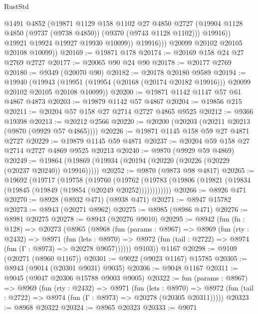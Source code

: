 \begin{lexlean}{RustStd}
\begin{coremodule}
{\begin{coremodule}
{{{{{{{{{{{{{{{{{{{{{{{{{{{{{{{{{{{{{{{                    @1491
                    @4852
                    (@19871
                      @1129
                      @158
                      @1102
                      @27
                      @4850
                      @2727
                      (@19904 @1128 @4850 (@9737 (@9738 @4850)) (@9370 (@9743 @1128 @1102)))
                      @19916))
                  @19921
                  @19924
                  @19927
                  @19930
                  @10099))
              @19916)))
        @20099
        @20102
        @20105
        @20108
        @10099))
@20169 := @19871 @178
@20174 := @20169 @158 @24 @27 @2769 @2727
@20177 := @20065 @90 @24 @90
@20178 := @20177 @2769
@20180 := @9349 (@20070 @90)
@20182 := @20178 @20180 @9589
@20194 := @19940
    (@19943 (@19951 (@19954 (@20168 (@20174 @20182 @19916))) @20099 @20102 @20105 @20108 @10099))
@20200 := @19871 @1142 @1147 @57 @61 @4867 @4873
@20203 := @19879 @1142 @57 @4867
@20204 := @19856 @215
@20211 := @20204 @57 @158 @27 @2714 @2727 @4865 @9525
@20212 := @9366 @19398
@20213 := @20212 @2566
@20220 := @20200 (@20203 (@20211 @20213 (@9870 (@9929 @57 @4865))))
@20226 := @19871 @1145 @158 @59 @27 @4871 @2727
@20229 := @19879 @1145 @59 @4871
@20237 := @20204 @59 @158 @27 @2714 @2727 @4869 @9525 @20213
@20240 := @9870 (@9929 @59 @4869)
@20249 := @19864 (@19869 (@19934 (@20194 (@20220 (@20226 (@20229 (@20237 @20240)) @19916)))))
@20252 := @9870 (@9873 @98 @4817)
@20265 := @19692
    (@19717
      (@19758
        (@19760
          (@19762 (@19783 (@19806 (@19821 (@19834 (@19845 (@19849 (@19854 (@20249 @20252))))))))))))
@20266 := @8926 @471
@20270 := @8928 (@8932 @471) (@8938 @471)
@20271 := @8947 @15782
@20273 := @8943 (@20271 @8962)
@20275 := @8985 (@8986 @471)
@20276 := @8981 @20275
@20278 := @8943 (@20276 @9010)
@20295 := @8942
    (fun (fn : @128) =>
    @20273
      (@8965
        (@8968
          (fun (params : @8967) =>
          @8969
            (fun (rty : @2432) =>
            @8971
              (fun (lets : @8970) =>
              @8972 (fun (tail : @2722) => @8974 (fun (Γ : @8973) => @20278 @9057))))))
        @9103))
    @1167
@20298 := @9109 (@20271 (@8960 @1167))
@20301 := @9022 (@9023 @1167) @15785
@20305 := @8943 (@9014 (@20301 @9031) @9035)
@20306 := @9048 @1167
@20311 := @9045 (@9047 @20306 @15788 @9003 @9005)
@20322 := fun (params : @8967) =>
  @8969
    (fun (rty : @2432) =>
    @8971
      (fun (lets : @8970) =>
      @8972 (fun (tail : @2722) => @8974 (fun (Γ : @8973) => @20278 (@20305 @20311)))))
@20323 := @8968 @20322
@20324 := @8965 @20323
@20333 := @9071
}}}}}}}}}}}}}}}}}}}}}}}}}}}}}}}}}}}}}}}
\end{coremodule}}
\end{coremodule}
\end{lexlean}

